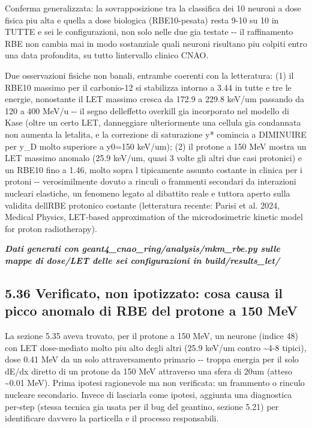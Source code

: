 \documentclass[
  italian,
]{article}
\begin{document}
Conferma generalizzata: la sovrapposizione tra la classifica dei 10 neuroni a dose fisica piu\textquotesingle{} alta e quella a dose biologica (RBE10-pesata) resta 9-10 su 10 in TUTTE e sei le configurazioni, non solo nelle due gia\textquotesingle{} testate -\/- il raffinamento RBE non cambia mai in modo sostanziale quali neuroni risultano piu\textquotesingle{} colpiti entro una data profondita\textquotesingle, su tutto l\textquotesingle intervallo clinico CNAO.

Due osservazioni fisiche non banali, entrambe coerenti con la letteratura: (1) il RBE10 massimo per il carbonio-12 si stabilizza intorno a 3.44 in tutte e tre le energie, nonostante il LET massimo cresca da 172.9 a 229.8 keV/um passando da 120 a 400 MeV/u -\/- il segno dell\textquotesingle effetto \textquotesingle overkill\textquotesingle{} gia\textquotesingle{} incorporato nel modello di Kase (oltre un certo LET, danneggiare ulteriormente una cellula gia\textquotesingle{} condannata non aumenta la letalita\textquotesingle, e la correzione di saturazione y* comincia a DIMINUIRE per y\_\allowbreak{}D molto superiore a y0=150 keV/um); (2) il protone a 150 MeV mostra un LET massimo anomalo (25.9 keV/um, quasi 3 volte gli altri due casi protonici) e un RBE10 fino a 1.46, molto sopra l tipicamente assunto costante in clinica per i protoni -\/- verosimilmente dovuto a rinculi o frammenti secondari da interazioni nucleari elastiche, un fenomeno legato al dibattito reale e tuttora aperto sulla validita\textquotesingle{} dell\textquotesingle RBE protonico costante (letteratura recente: Parisi et al. 2024, Medical Physics, \textquotesingle LET-based approximation of the microdosimetric kinetic model for proton radiotherapy\textquotesingle).

\emph{\textbf{Dati generati con geant4\_\allowbreak{}cnao\_\allowbreak{}ring/analysis/mkm\_\allowbreak{}rbe.py sulle mappe di dose/LET delle sei configurazioni in build/results\_\allowbreak{}let/}}

\subsection{5.36 Verificato, non ipotizzato: cosa causa il picco anomalo di RBE del protone a 150 MeV}\label{verificato-non-ipotizzato-cosa-causa-il-picco-anomalo-di-rbe-del-protone-a-150-mev}

La sezione 5.35 aveva trovato, per il protone a 150 MeV, un neurone (indice 48) con LET dose-mediato molto piu\textquotesingle{} alto degli altri (25.9 keV/um contro \textasciitilde4-8 tipici), dose 0.41 MeV da un solo attraversamento primario -\/- troppa energia per il solo dE/dx diretto di un protone da 150 MeV attraverso una sfera di 20um (atteso \textasciitilde0.01 MeV). Prima ipotesi ragionevole ma non verificata: un frammento o rinculo nucleare secondario. Invece di lasciarla come ipotesi, aggiunta una diagnostica per-step (stessa tecnica gia\textquotesingle{} usata per il bug del geantino, sezione 5.21) per identificare davvero la particella e il processo responsabili.
\end{document}
